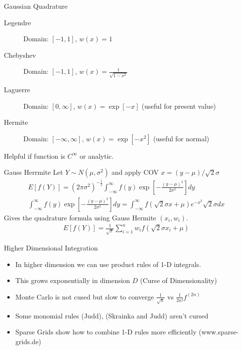 \documentclass[xcolor=pdftex,dvipsnames,table,mathserif]{beamer}
\begin{document}
\begin{frame}{Gaussian Quadrature}
\begin{description}
\item[Legendre] Domain: $[-1,1]$, $w(x) = 1$
\item[Chebyshev] Domain: $[-1,1]$, $w(x) = \frac{1}{\sqrt{1-x^2}}$
\item[Laguerre] Domain: $[0,\infty]$, $w(x) = \exp[-x]$ (useful for present value)
\item[Hermite] Domain: $[-\infty,\infty]$, $w(x) = \exp[-x^2]$ (useful for normal)
\end{description}
Helpful if function is $C^{\infty}$ or analytic.
\end{frame}

\begin{frame}{Gauss Herrmite}
Let $Y\sim N(\mu,\sigma^2)$ and apply COV $x = (y-\mu)/\sqrt{2} \sigma$
\begin{eqnarray*}
E[f(Y)] = (2 \pi \sigma^2)^{-\frac{1}{2}} \int_{-\infty}^{\infty} f(y) \exp\left[-\frac{(y-\mu)^2}{2\sigma^2} \right] dy \\
\int_{-\infty}^{\infty} f(y) \exp\left[-\frac{(y-\mu)^2}{2\sigma^2} \right] dy = \int_{-\infty}^{\infty} f(\sqrt{2} \sigma x + \mu) e^{-x^2} \sqrt{2} \sigma dx
\end{eqnarray*}
Gives the quadrature formula using Gauss Hermite $(x_i,w_i)$.
\begin{eqnarray*}
E[f(Y)] = \frac{1}{\sqrt{\pi}} \sum_{i=1}^n w_i f(\sqrt{2}\sigma x_i + \mu)
\end{eqnarray*}
\end{frame}

\begin{frame}{Higher Dimensional Integration}
\begin{itemize}
\item In higher dimension we can use product rules of 1-D integrals.
\item This grows exponentially in dimension $D$ (Curse of Dimensionality)
\item Monte Carlo is not cused but slow to converge $\frac{1}{\sqrt{n}}$ vs $\frac{1}{2n!} f^{(2n)}$
\item Some monomial rules (Judd), (Skrainka and Judd) aren't cursed
\item Sparse Grids show how to combine 1-D rules more efficiently (www.sparse-grids.de)
\end{itemize}
\end{frame}
\end{document}
